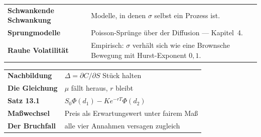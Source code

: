\begin{forschung}
\begin{center}
{\small
\renewcommand{\arraystretch}{1.45}
\begin{tabular}{@{}P{3.0cm}P{5.2cm}@{}}
\toprule
\textbf{Schwankende Schwankung} & Modelle, in denen $\sigma$ selbst ein Prozess ist.\\
\textbf{Sprungmodelle} & Poisson-Sprünge über der Diffusion --- Kapitel~4.\\
\textbf{Rauhe Volatilität} & Empirisch: $\sigma$ verhält sich wie eine Brownsche Bewegung mit Hurst-Exponent $0{,}1$.\\
\bottomrule
\end{tabular}}
\end{center}

\begin{center}
\begin{minipage}{0.88\textwidth}
\end{minipage}
\end{center}
\end{forschung}

\begin{merksatz}
\begin{center}
\renewcommand{\arraystretch}{1.5}
\begin{tabular}{@{}P{3.0cm}P{5.6cm}@{}}
\toprule
\textbf{Nachbildung} & $\Delta = \partial C/\partial S$ Stück halten\\
\textbf{Die Gleichung} & $\mu$ fällt heraus, $r$ bleibt\\
\textbf{Satz 13.1} & $S_0\Phi(d_1) - Ke^{-rT}\Phi(d_2)$\\
\textbf{Maßwechsel} & Preis als Erwartungswert unter fairem Maß\\
\textbf{Der Bruchfall} & alle vier Annahmen versagen zugleich\\
\bottomrule
\end{tabular}
\end{center}

\begin{center}
\begin{minipage}{0.88\textwidth}
\end{minipage}
\end{center}
\end{merksatz}

